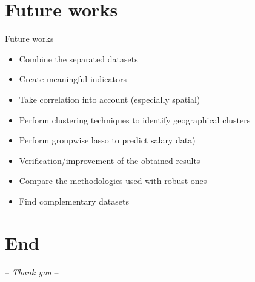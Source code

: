 \documentclass[xcolor=dvipsnames]{beamer}
\begin{document}
\section{Future works}
		\begin{frame}{\vskip 0.05cm\centerline{\Huge\textcolor{bscuro}{Future works}}}

\begin{itemize}
	\item Combine the separated datasets
	\item Create meaningful indicators
	\item Take correlation into account (especially spatial)
	\item Perform clustering techniques to identify geographical clusters
	\item Perform groupwise lasso to predict salary data)
	\item Verification/improvement of the obtained results 
	\item Compare the methodologies used with robust ones
	\item Find complementary datasets
\end{itemize}

\end{frame}		
	
\section{End}
	\begin{frame}
	\centerline{\Huge\textcolor{bscuro}{ -- \emph{Thank you} -- }}
\end{frame}
\end{document}
